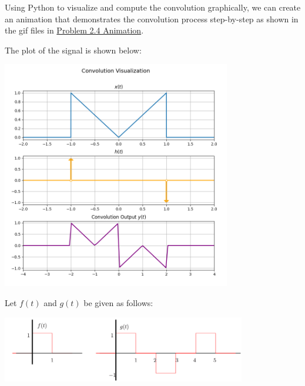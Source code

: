 \documentclass[a4paper, 10pt]{article}
\begin{document}
\begin{solution}
    Using Python to visualize and compute the convolution graphically,
    we can create an animation that demonstrates the convolution process step-by-step
    as shown in the gif files in \href{https://github.com/patthadon-p/CEDT-2110203-CEM-II/blob/main/signal/homework-2/images/problem_2_4.gif}{Problem 2.4 Animation}.
    
    \vspace{3mm}
    
    The plot of the signal is shown below:
    \begin{center}
        \includegraphics[width=0.75\textwidth]{images/problem_2_4_snapshot.png}
    \end{center}
\end{solution}


\begin{problem}
Let \( f(t) \) and \( g(t) \) be given as follows:
\begin{center}
    \includegraphics[width=0.8\textwidth]{images/problem_3_reference.png}
\end{center}
\end{problem}
\end{document}
